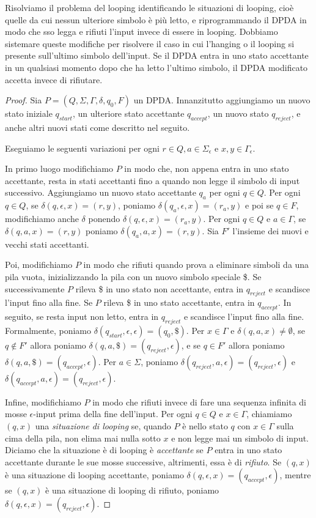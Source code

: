 \documentclass[12pt]{report}
\begin{document}
Risolviamo il problema del looping identificando le situazioni di looping, cioè quelle da cui nessun ulteriore simbolo è più letto, e riprogrammando il DPDA in modo che sso legga e rifiuti l'input invece di essere in looping. Dobbiamo sistemare queste modifiche per risolvere il caso in cui l'hanging o il looping si presente sull'ultimo simbolo dell'input. Se il DPDA entra in uno stato accettante in un qualsiasi momento dopo che ha letto l'ultimo simbolo, il DPDA modificato accetta invece di rifiutare.
\begin{proof}
Sia $P = (Q, \Sigma, \Gamma, \delta, q_0, F)$ un DPDA. Innanzitutto aggiungiamo un nuovo stato iniziale $q_{start}$, un ulteriore stato accettante $q_{accept}$, un nuovo stato $q_{reject}$, e anche altri nuovi stati come descritto nel seguito.

Eseguiamo le seguenti variazioni per ogni $r \in Q, a \in \Sigma_\epsilon$ e $x, y \in \Gamma_\epsilon$.

In primo luogo modifichiamo $P$ in modo che, non appena entra in uno stato accettante, resta in stati accettanti fino a quando non legge il simbolo di input successivo. Aggiungiamo un nuovo stato accettante $q_a$ per ogni $q \in Q$. Per ogni $q \in Q$, se $\delta(q, \epsilon, x) = (r, y)$, poniamo $\delta(q_a, \epsilon, x) = (r_a, y)$ e poi se $q \in F$, modifichiamo anche $\delta$ ponendo $\delta(q, \epsilon, x) = (r_a, y)$. Per ogni $q \in Q$ e $a \in \Gamma$, se $\delta(q, a, x) = (r, y)$ poniamo $\delta(q_a, a, x) = (r, y)$. Sia $F'$ l'insieme dei nuovi e vecchi stati accettanti.

Poi, modifichiamo $P$ in modo che rifiuti quando prova a eliminare simboli da una pila vuota, inizializzando la pila con un nuovo simbolo speciale \$. Se successivamente $P$ rileva \$ in uno stato non accettante, entra in $q_{reject}$ e scandisce l'input fino alla fine. Se $P$ rileva \$ in uno stato accettante, entra in $q_{accept}$. In seguito, se resta input non letto, entra in $q_{reject}$ e scandisce l'input fino alla fine. Formalmente, poniamo $\delta(q_{start}, \epsilon, \epsilon) = (q_0, \$)$. Per $x \in\Gamma$ e $\delta(q, a, x) \neq \emptyset$, se $q \notin F'$ allora poniamo $\delta(q, a, \$) = (q_{reject}, \epsilon)$, e se $q \in F'$ allora poniamo $\delta(q, a, \$) = (q_{accept}, \epsilon)$. Per $a \in \Sigma$, poniamo $\delta(q_{reject}, a, \epsilon) = (q_{reject}, \epsilon)$ e $\delta(q_{accept}, a, \epsilon) = (q_{reject}, \epsilon)$.

Infine, modifichiamo $P$ in modo che rifiuti invece di fare una sequenza infinita di mosse $\epsilon$-input prima della fine dell'input. Per ogni $q \in Q$ e $x \in \Gamma$, chiamiamo $(q, x)$ una \textit{situazione di looping} se, quando $P$ è nello stato $q$ con $x \in \Gamma$ sulla cima della pila, non elima mai nulla sotto $x$ e non legge mai un simbolo di input. Diciamo che la situazione è di looping è \textit{accettante} se $P$ entra in uno stato accettante durante le sue mosse successive, altrimenti, essa è di \textit{rifiuto}. Se $(q, x)$ è una situazione di looping accettante, poniamo $\delta(q, \epsilon, x) = (q_{accept}, \epsilon)$, mentre se $(q, x)$ è una situazione di looping di rifiuto, poniamo $\delta(q, \epsilon, x) = (q_{reject}, \epsilon)$.
\end{proof}
\end{document}
